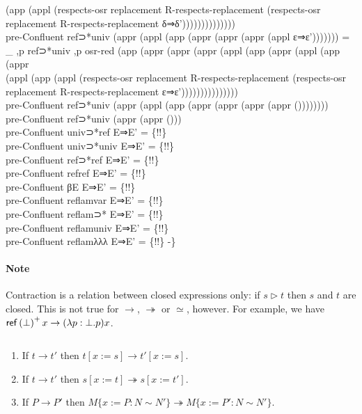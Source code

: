 {\begin{code}
{\>  (app (appl (respects-osr replacement R-respects-replacement (respects-osr replacement R-respects-replacement δ⇒δ'))))))))))))))\<\\
\>pre-Confluent ref⊃*univ (appr (appl (app (appr (appr (appr (appl ε⇒ε'))))))) = \_ ,p ref⊃*univ ,p osr-red (app (appr (appr (appr (appl (app (appr (appl (app (appr \<\\
\>  (appl (app (appl (respects-osr replacement R-respects-replacement (respects-osr replacement R-respects-replacement ε⇒ε')))))))))))))))\<\\
\>pre-Confluent ref⊃*univ (appr (appl (app (appr (appr (appr (appr ())))))))\<\\
\>pre-Confluent ref⊃*univ (appr (appr ()))\<\\
\>pre-Confluent univ⊃*ref E⇒E' = \{!!\}\<\\
\>pre-Confluent univ⊃*univ E⇒E' = \{!!\}\<\\
\>pre-Confluent ref⊃*ref E⇒E' = \{!!\}\<\\
\>pre-Confluent refref E⇒E' = \{!!\}\<\\
\>pre-Confluent βE E⇒E' = \{!!\}\<\\
\>pre-Confluent reflamvar E⇒E' = \{!!\}\<\\
\>pre-Confluent reflam⊃* E⇒E' = \{!!\}\<\\
\>pre-Confluent reflamuniv E⇒E' = \{!!\}\<\\
\>pre-Confluent reflamλλλ E⇒E' = \{!!\} -\}}\<%
\\
\>\<%
\end{code}
}

\paragraph{Note}
Contraction is a relation between closed expressions only: if $s \rhd t$ then $s$ and $t$ are closed.  This is not true for $\rightarrow$, $\twoheadrightarrow$ or $\simeq$, however.  For example, we have $\mathsf{ref} \left( {\bot} \right)^+ x \rightarrow (\lambda p:\bot.p)x$.

\begin{lm}
$ $
\begin{enumerate}
\item
If $t \rightarrow t'$ then $t[x:=s] \rightarrow t'[x:=s]$.
\item
If $t \rightarrow t'$ then $s[x:=t] \twoheadrightarrow s[x:=t']$.
\item
If $P \rightarrow P'$ then $M \{ x:= P : N \sim N' \} \twoheadrightarrow M \{ x:=P' : N \sim N' \}$.
\end{enumerate}
\end{lm}

